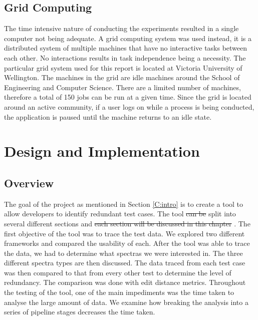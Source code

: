 \documentclass[11pt
              , a4paper
              , twoside
              , openright
              ]{report}
\providecommand{\DIFadd}[1]{{\protect\color{blue}\uwave{#1}}} %
\providecommand{\DIFdel}[1]{{\protect\color{red}\sout{#1}}}                      %
\providecommand{\DIFaddbegin}{} %
\providecommand{\DIFaddend}{} %
\providecommand{\DIFdelbegin}{} %
\providecommand{\DIFdelend}{} %
\begin{document}
\section{Grid Computing}
The time intensive nature of conducting the experiments resulted in a single computer not being adequate. A grid computing system was used instead, it is a distributed system of multiple machines that have no interactive tasks between each other. No interactions results in task independence being a necessity. The particular grid system used for this report is located at Victoria University of Wellington. The machines in the grid are idle machines around the School of Engineering and Computer Science. There are a limited number of machines, therefore a total of 150 jobs can be run at a given time. Since the grid is located around an active community, if a user logs on while a process is being conducted, the application is paused until the machine returns to an idle state. \newpage 
 \newpage \chapter{Design and Implementation}\label{C:workdone}

\section{Overview}

The goal of the project as mentioned in Section \ref{C:intro} is to create a tool to allow developers to identify redundant test cases. The tool \DIFdelbegin \DIFdel{can be }\DIFdelend \DIFaddbegin \DIFadd{is }\DIFaddend split into several different sections and \DIFdelbegin \DIFdel{each section will be discussed in this chapter }\DIFdelend \DIFaddbegin \DIFadd{the chapter will discuss each}\DIFaddend . The first objective of the tool was to trace the test data. We explored two different frameworks and compared the usability of each. After the tool was able to trace the data, we had to determine what spectras we were interested in. The three different spectra types are then discussed. The data traced from each test case was then compared to that from every other test to determine the level of redundancy. The comparison was done with edit distance metrics. Throughout the testing of the tool, one of the main impediments was the time taken to analyse the large amount of data. We examine how breaking the analysis into a series of pipeline stages decreases the time taken.
\end{document}
